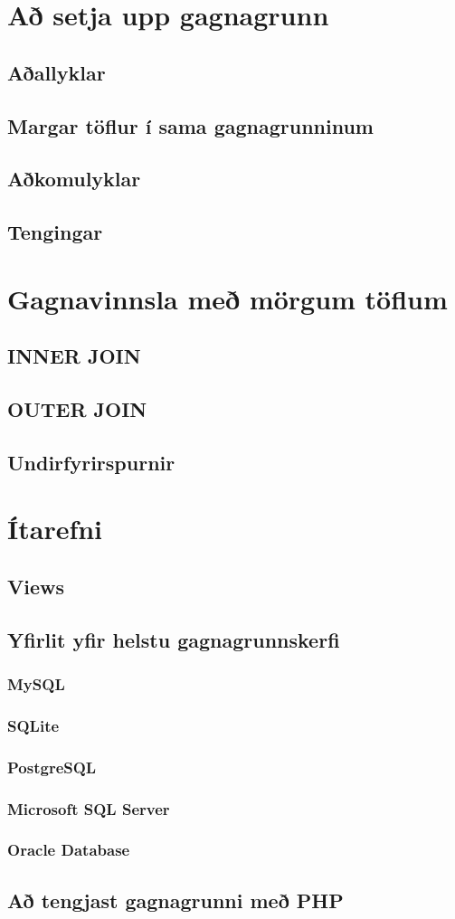 \documentclass[nohyper,notoc,justified]{tufte-book}
\begin{document}
\chapter{Að setja upp gagnagrunn}
\section{Aðallyklar} %
\section{Margar töflur í sama gagnagrunninum}
\section{Aðkomulyklar} %
\section{Tengingar} %

\chapter{Gagnavinnsla með mörgum töflum}
\section{INNER JOIN}
\section{OUTER JOIN}
\section{Undirfyrirspurnir}

\chapter{Ítarefni}
\label{kafli:itarefni}
\section{Views}
\section{Yfirlit yfir helstu gagnagrunnskerfi}
\subsection{MySQL}
\subsection{SQLite}
\subsection{PostgreSQL}
\subsection{Microsoft SQL Server}
\subsection{Oracle Database}
\section{Að tengjast gagnagrunni með PHP}
\end{document}
